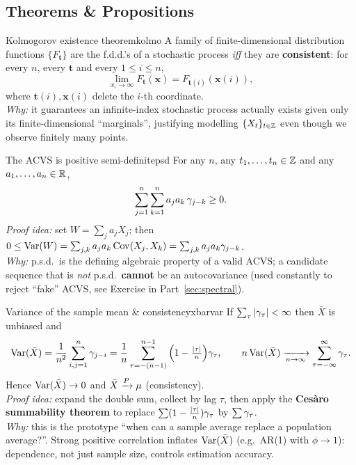 \subsection{Theorems \& Propositions}

\begin{theorem}{Kolmogorov existence theorem}{kolmo}
A family of finite-dimensional distribution functions $\{F_{\mathbf t}\}$ are
the f.d.d.'s of a stochastic process \emph{iff} they are
\textbf{consistent}: for every $n$, every $\mathbf t$ and every $1\le i\le n$,
\[
\lim_{x_i\to\infty}F_{\mathbf t}(\mathbf x)=F_{\mathbf t(i)}(\mathbf x(i)),
\]
where $\mathbf t(i),\mathbf x(i)$ delete the $i$-th coordinate.\\[2pt]
\textit{Why:} it guarantees an infinite-index stochastic process actually
exists given only its finite-dimensional ``marginals'', justifying modelling
$\{X_t\}_{t\in\mathbb{Z}}$ even though we observe finitely many points.
\end{theorem}

\begin{proposition}{The ACVS is positive semi-definite}{psd}
For any $n$, any $t_1,\dots,t_n\in\mathbb{Z}$ and any $a_1,\dots,a_n\in\mathbb{R}$,
\[
\sum_{j=1}^n\sum_{k=1}^n a_ja_k\,\gamma_{j-k}\ge0 .
\]
\textit{Proof idea:} set $W=\sum_j a_jX_j$; then
$0\le\operatorname{Var}(W)=\sum_{j,k}a_ja_k\operatorname{Cov}(X_j,X_k)=\sum_{j,k}a_ja_k\gamma_{j-k}$.\\
\textit{Why:} p.s.d.\ is the defining algebraic property of a valid ACVS; a
candidate sequence that is \emph{not} p.s.d.\ \textbf{cannot} be an
autocovariance (used constantly to reject ``fake'' ACVS, see
Exercise in Part~\ref{sec:spectral}).
\end{proposition}

\begin{proposition}{Variance of the sample mean \& consistency}{xbarvar}
If $\sum_{\tau}\left\lvert \gamma_\tau \right\rvert<\infty$ then $\bar X$ is unbiased and
\[
\operatorname{Var}(\bar X)=\frac1{n^2}\sum_{i,j=1}^n\gamma_{j-i}
=\frac1{n}\sum_{\tau=-(n-1)}^{n-1}\Big(1-\tfrac{\left\lvert \tau \right\rvert}{n}\Big)\gamma_\tau,
\qquad
n\operatorname{Var}(\bar X)\xrightarrow[n\to\infty]{}\sum_{\tau=-\infty}^{\infty}\gamma_\tau .
\]
Hence $\operatorname{Var}(\bar X)\to0$ and $\bar X\xrightarrow{P}\mu$ (consistency).\\
\textit{Proof idea:} expand the double sum, collect by lag $\tau$, then apply
the \textbf{Ces\`aro summability theorem} to replace
$\sum(1-\tfrac{\left\lvert \tau \right\rvert}{n})\gamma_\tau$ by $\sum\gamma_\tau$.\\
\textit{Why:} this is the prototype ``when can a sample average replace a
population average?''. Strong positive correlation inflates $\operatorname{Var}(\bar X)$
(e.g.\ AR(1) with $\phi\to1$): dependence, not just sample size, controls
estimation accuracy.
\end{proposition}

